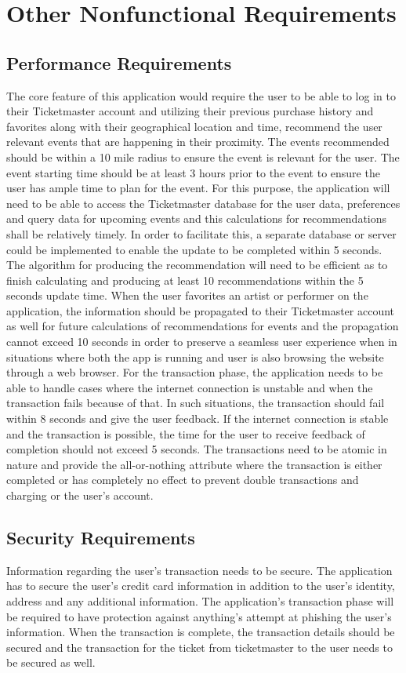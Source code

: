 \documentclass{article}
\begin{document}
	\section{Other Nonfunctional Requirements}
		\subsection{Performance Requirements}
           The core feature of this application would require the user to be able to log in to their Ticketmaster account and utilizing their previous purchase history and favorites along with their geographical location and time, recommend the user relevant events that are happening in their proximity. The events recommended should be within a 10 mile radius to ensure the event is relevant for the user. The event starting time should be at least 3 hours prior to the event to ensure the user has ample time to plan for the event. For this purpose, the application will need to be able to access the Ticketmaster database for the user data, preferences and query data for upcoming events and this calculations for recommendations shall be relatively timely. In order to facilitate this, a separate database or server could be implemented to enable the update to be completed within 5 seconds. The algorithm for producing the recommendation will need to be efficient as to finish calculating and producing at least 10 recommendations within the 5 seconds update time. When the user favorites an artist or performer on the application, the information should be propagated to their Ticketmaster account as well for future calculations of recommendations for events and the propagation cannot exceed 10 seconds in order to preserve a seamless user experience when in situations where both the app is running and user is also browsing the website through a web browser. For the transaction phase, the application needs to be able to handle cases where the internet connection is unstable and when the transaction fails because of that. In such situations, the transaction should fail within 8 seconds and give the user feedback. If the internet connection is stable and the transaction is possible, the time for the user to receive feedback of completion should not exceed 5 seconds. The transactions need to be atomic in nature and provide the all-or-nothing attribute where the transaction is either completed or has completely no effect to prevent double transactions and charging or the user’s account.
		\subsection{Security Requirements}
           Information regarding the user’s transaction needs to be secure. The application has to secure the user’s credit card information in addition to the user’s identity, address and any additional information. The application’s transaction phase will be required to have protection against anything’s attempt at phishing the user’s information. When the transaction is complete, the transaction details should be secured and the transaction for the ticket from ticketmaster to the user needs to be secured as well. 
\end{document}
